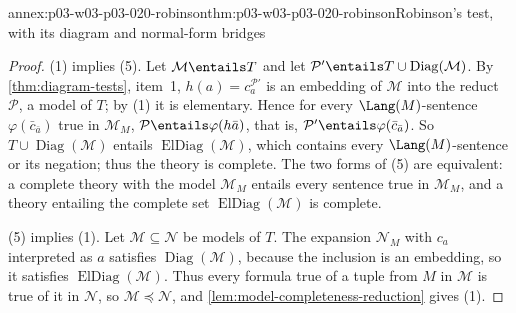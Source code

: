 \begin{annexitem}{annex:p03-w03-p03-020-robinson}{thm:p03-w03-p03-020-robinson}{Robinson's test, with its diagram and normal-form bridges}
\begin{proof}
(1) implies (5). Let \(\mathcal M\entails T\) and let
\(\mathcal P'\entails T\cup\operatorname{Diag}(\mathcal M)\). By
\cref{thm:diagram-tests}, item~1, \(h(a)=c_a^{\mathcal P'}\) is an
embedding of \(\mathcal M\) into the reduct \(\mathcal P\), a model of
\(T\); by (1) it is elementary. Hence for every \(\Lang(M)\)-sentence
\(\varphi(\bar c_{\bar a})\) true in \(\mathcal M_M\),
\(\mathcal P\entails\varphi(h\bar a)\), that is,
\(\mathcal P'\entails\varphi(\bar c_{\bar a})\). So
\(T\cup\operatorname{Diag}(\mathcal M)\) entails
\(\operatorname{ElDiag}(\mathcal M)\), which contains every
\(\Lang(M)\)-sentence or its negation; thus the theory is complete. The two
forms of (5) are equivalent: a complete theory with the model
\(\mathcal M_M\) entails every sentence true in \(\mathcal M_M\), and a
theory entailing the complete set \(\operatorname{ElDiag}(\mathcal M)\) is
complete.

(5) implies (1). Let \(\mathcal M\subseteq\mathcal N\) be models of \(T\).
The expansion \(\mathcal N_M\) with \(c_a\) interpreted as \(a\) satisfies
\(\operatorname{Diag}(\mathcal M)\), because the inclusion is an embedding,
so it satisfies \(\operatorname{ElDiag}(\mathcal M)\). Thus every formula
true of a tuple from \(M\) in \(\mathcal M\) is true of it in
\(\mathcal N\), so \(\mathcal M\preccurlyeq\mathcal N\), and
\cref{lem:model-completeness-reduction} gives (1).
\end{proof}
\end{annexitem}

